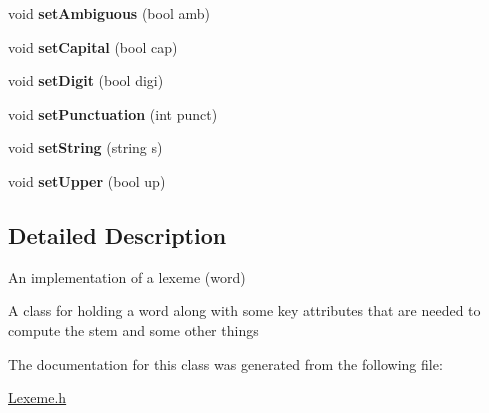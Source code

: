 \begin{DoxyCompactItemize}
void {\bfseries set\+Ambiguous} (bool amb)
\item 
\mbox{\label{classLexeme_aa54d86594141f95df8a0364aebc931f2}} 
void {\bfseries set\+Capital} (bool cap)
\item 
\mbox{\label{classLexeme_a4bf15e88113bc3cd10dff188fef37752}} 
void {\bfseries set\+Digit} (bool digi)
\item 
\mbox{\label{classLexeme_a620288e33ed2b3957023b3d325febc13}} 
void {\bfseries set\+Punctuation} (int punct)
\item 
\mbox{\label{classLexeme_a90a1a2080fb503b0a206a075fd4d038a}} 
void {\bfseries set\+String} (string s)
\item 
\mbox{\label{classLexeme_a09873449eb90bc9be0f4df1edcf97b26}} 
void {\bfseries set\+Upper} (bool up)
\end{DoxyCompactItemize}


\subsection{Detailed Description}
An implementation of a lexeme (word) 

A class for holding a word along with some key attributes that are needed to compute the stem and some other things 

The documentation for this class was generated from the following file\+:\begin{DoxyCompactItemize}
\item 
\hyperlink{Lexeme_8h}{Lexeme.\+h}\end{DoxyCompactItemize}
